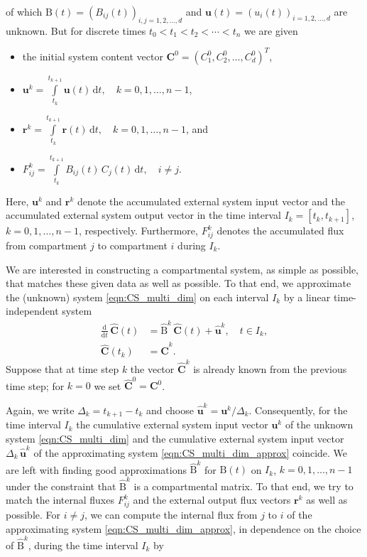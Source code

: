 \documentclass[draft]{agujournal2019}
\renewcommand{\vec}[1]{\mathbf{#1}}
\newcommand{\tens}[1]{\mathrm{#1}}
\newcommand{\deriv}[1]{\frac{\mathrm{d}}{\mathrm{d}#1}}
\newcommand{\dd}[1]{\,\mathrm{d}#1}
\newcommand{\intl}{\int\limits}
\begin{document}
        of which $\tens{B}(t)=(B_{ij}(t))_{i,j=1,2,\ldots,d}$ and $\vec{u}(t)=(u_i(t))_{i=1,2,\ldots,d}$ are unknown.
        But for discrete times $t_0<t_1<t_2<\cdots<t_n$ we are given
         \begin{itemize} 
            \item the initial system content vector $\vec{C}^0=(C^0_1,C^0_2,\ldots,C^0_d)^T$,
            \item $\vec{u}^k = \intl_{t_k}^{t_{k+1}} \vec{u}(t)\dd{t},\quad k=0,1,\ldots,n-1$, 
            \item $\vec{r}^k = \intl_{t_k}^{t_{k+1}} \vec{r}(t)\dd{t},\quad k=0,1,\ldots,n-1$, and
            \item $F_{ij}^k = \intl_{t_k}^{t_{k+1}} B_{ij}(t)\,C_j(t)\dd{t},\quad i\neq j$.
         \end{itemize} 
        Here, $\vec{u}^k$ and $\vec{r}^k$ denote the accumulated external system input vector and the accumulated external system output vector in the time interval $I_k=[t_k,t_{k+1}]$, $k=0,1,\ldots,n-1$, respectively.
        Furthermore, $F^k_{ij}$ denotes the accumulated flux from compartment $j$ to compartment $i$ during $I_k$.

        We are interested in constructing a compartmental system, as simple as possible, that matches these given data as well as possible.
        To that end, we approximate the (unknown) system \eqref{eqn:CS_multi_dim} on each interval $I_k$ by a linear time-independent system
        \begin{equation}\label{eqn:CS_multi_dim_approx}
            \begin{aligned}
                \deriv{t}\,\widehat{\vec{C}}(t) &= \widehat{\tens{B}}^k\,\widehat{\vec{C}}(t) + \widehat{\vec{u}}^k,\quad t\in I_k,\\
                \widehat{\vec{C}}(t_k) &= \widehat{\vec{C}}^k.
            \end{aligned}
        \end{equation}
        Suppose that at time step $k$ the vector $\widehat{\vec{C}}^k$ is already known from the previous time step; for $k=0$ we set $\widehat{\vec{C}}^0=\vec{C}^0$.

        Again, we write $\Delta_k=t_{k+1}-t_k$ and choose $\widehat{\vec{u}}^k=\vec{u}^k/\Delta_k$.
        Consequently, for the time interval $I_k$ the cumulative external system input vector $\vec{u}^k$ of the unknown system \eqref{eqn:CS_multi_dim} and the cumulative external system input vector $\Delta_k\,\widehat{\vec{u}}^k$ of the approximating system \eqref{eqn:CS_multi_dim_approx} coincide.
        We are left with finding good approximations $\widehat{\tens{B}}^k$ for $\tens{B}(t)$ on $I_k$, $k=0,1,\ldots,n-1$ under the constraint that $\widehat{\tens{B}}^k$ is a compartmental matrix.
        To that end, we try to match the internal fluxes $F^k_{ij}$ and the external output flux vectors $\vec{r}^k$ as well as possible.
        For $i\neq j$, we can compute the internal flux from $j$ to $i$ of the approximating system \eqref{eqn:CS_multi_dim_approx}, in dependence on the choice of $\widehat{\tens{B}}^k$, during the time interval $I_k$ by
\end{document}
